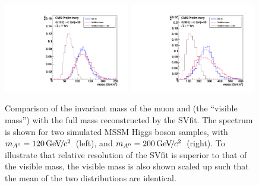 \begin{figure}[t]
\begin{center}
\includegraphics*[width=0.49\textwidth]{svfit_chapter/figures/sv_fit_approval_plots/sv_vs_vis_A120.pdf}
\includegraphics*[width=0.49\textwidth]{svfit_chapter/figures/sv_fit_approval_plots/sv_vs_vis_A300.pdf}
\caption[Comparison of SVfit with the visible mass observable]{Comparison of the
invariant mass of the muon and \tjet (the ``visible mass'') with the full \TT
mass reconstructed by the SVfit. The spectrum is shown for two simulated MSSM
Higgs boson samples, with $m_{A^0} = 120{\,\text{Ge\hspace{-.08em}V\hspace{-0.16em}/\hspace{-0.08em}}c^\text{2}}$~(left), and $m_{A^0} = 200{\,\text{Ge\hspace{-.08em}V\hspace{-0.16em}/\hspace{-0.08em}}c^\text{2}}$~(right).  To
illustrate that relative resolution of the SVfit is superior to that of the
visible mass, the visible mass is also shown scaled up such that the mean of the
two distributions are identical.} \label{fig:SVversusVis}
\end{center}
\end{figure} 

\ifx\master\undefined\fi

